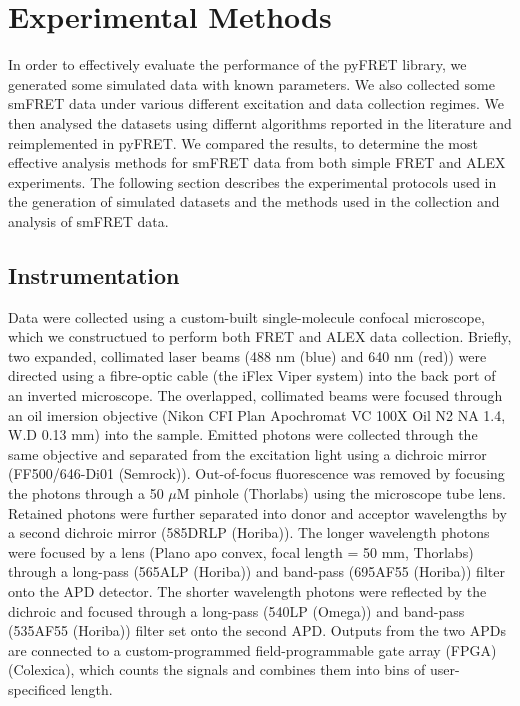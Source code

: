 \section{Experimental Methods}
In order to effectively evaluate the performance of the pyFRET library, we generated some simulated data with known parameters.  We also collected some smFRET data under various different excitation and data collection regimes. We then analysed the datasets using differnt algorithms reported in the literature and reimplemented in pyFRET. We  compared the results, to determine the most effective analysis methods for smFRET data from both simple FRET and ALEX experiments. The following section describes the experimental protocols used in the generation of simulated datasets and the methods used in the collection and analysis of smFRET data.

\subsection{Instrumentation}
\label{sect:instrumentation}
Data were collected using a custom-built single-molecule confocal microscope, which we constructued to perform both FRET and ALEX data collection. Briefly, two expanded, collimated laser beams (488 nm (blue) and 640 nm (red)) were directed using a fibre-optic cable (the iFlex Viper system) into the back port of an inverted microscope. The overlapped, collimated beams were focused through an oil imersion objective (Nikon CFI Plan Apochromat VC 100X Oil N2 NA 1.4, W.D 0.13 mm) into the sample. Emitted photons were collected through the same objective and separated from the excitation light using a dichroic mirror (FF500/646-Di01 (Semrock)). Out-of-focus fluorescence was removed by focusing the photons through a 50 $\mu$M pinhole (Thorlabs) using the microscope tube lens. Retained photons were further separated into donor and acceptor wavelengths by a second dichroic mirror (585DRLP (Horiba)). The longer wavelength photons were focused by a lens (Plano apo convex, focal length = 50 mm, Thorlabs) through a long-pass (565ALP (Horiba)) and band-pass (695AF55 (Horiba)) filter onto the APD detector. The shorter wavelength photons were reflected by the dichroic and focused through a long-pass (540LP (Omega)) and band-pass (535AF55 (Horiba)) filter set onto the second APD. Outputs from the two APDs are connected to a custom-programmed field-programmable gate array (FPGA) (Colexica), which counts the signals and combines them into bins of user-specificed length. 

